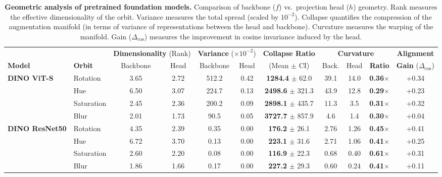 \documentclass{article}
\theoremstyle{plain}
\theoremstyle{definition}
\theoremstyle{remark}
\begin{document}
\begin{table}[t]
\centering
\scriptsize
\caption{\textbf{Geometric analysis of pretrained foundation models.} Comparison of backbone ($f$) vs.\ projection head ($h$) geometry. Rank measures the effective dimensionality of the orbit. Variance measures the total spread (scaled by $10^{-2}$). Collapse quantifies the compression of the augmentation manifold (in terms of variance of representations between the head and backbone). Curvature measures the warping of the manifold. Gain ($\Delta_{\text{cos}}$) measures the improvement in cosine invariance induced by the head. }
\label{tab:pretrained-geometry}
\begin{tabular}{@{}llcc|cc|c|ccc|c@{}}
\toprule
& & \multicolumn{2}{c|}{\textbf{Dimensionality} (Rank)} & \multicolumn{2}{c|}{\textbf{Variance} ($\times 10^{-2}$)} & \textbf{Collapse Ratio} & \multicolumn{3}{c|}{\textbf{Curvature}} & \textbf{Alignment} \\
\textbf{Model} & \textbf{Orbit} & Backbone & Head & Backbone & Head & (Mean $\pm$ CI) & Back. & Head & \textbf{Ratio} & \textbf{Gain} ($\Delta_{\text{cos}}$) \\ \midrule

\multirow{4}{*}{\textbf{DINO ViT-S}} 
& Rotation & 3.65 & 2.72 & 512.2 & 0.42 & \textbf{1284.4} $\pm$ 62.0 & 39.1 & 14.0 & \textbf{0.36}$\times$ & +0.34 \\
& Hue & 6.50 & 3.07 & 224.7 & 0.13 & \textbf{2498.6} $\pm$ 321.3 & 43.9 & 12.8 & \textbf{0.29}$\times$ & +0.23 \\
& Saturation & 2.45 & 2.36 & 200.2 & 0.09 & \textbf{2898.1} $\pm$ 435.7 & 11.3 & 3.5 & \textbf{0.31}$\times$ & +0.32 \\
& Blur & 2.01 & 1.73 & 90.5 & 0.05 & \textbf{3727.7} $\pm$ 857.9 & 4.6 & 1.4 & \textbf{0.30}$\times$ & +0.04 \\ \midrule

\multirow{4}{*}{\textbf{DINO ResNet50}} 
& Rotation & 4.35 & 2.39 & 0.35 & 0.00 & \textbf{176.2} $\pm$ 26.1 & 2.76 & 1.26 & \textbf{0.45}$\times$ & +0.41 \\
& Hue & 6.72 & 3.70 & 0.13 & 0.00 & \textbf{223.1} $\pm$ 31.6 & 2.71 & 1.06 & \textbf{0.41}$\times$ & +0.25 \\
& Saturation & 2.60 & 2.20 & 0.08 & 0.00 & \textbf{116.9} $\pm$ 22.3 & 0.68 & 0.40 & \textbf{0.61}$\times$ & +0.31 \\ 
& Blur & 1.86 & 1.66 & 0.17 & 0.00 & \textbf{227.2} $\pm$ 29.3 & 0.60 & 0.24 & \textbf{0.41}$\times$ & +0.11 \\ \midrule


\end{tabular}
\end{table}
\end{document}
